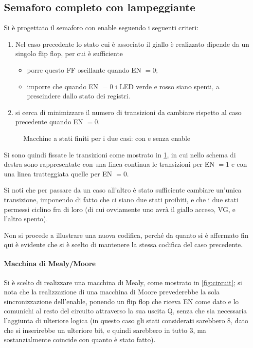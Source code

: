 \documentclass[a4paper,10pt]{article}
\begin{document}
\subsection{Semaforo completo con lampeggiante}

Si è progettato il semaforo con enable seguendo i seguenti criteri:
\begin{enumerate}
	\item Nel caso precedente lo stato cui è associato il giallo è realizzato dipende da un singolo flip flop, per cui è sufficiente
	\begin{itemize}
		\item porre questo FF oscillante quando EN $ = 0 $;
		\item imporre che quando  EN $ = 0 $ i LED verde e rosso siano spenti, a prescindere dallo stato dei registri.
	\end{itemize}
	\item si cerca di minimizzare il numero di transizioni da cambiare rispetto al caso precedente quando EN $ = 0 $.
\end{enumerate}

\begin{figure}[H]
	\centering
	
	\caption{Macchine a stati finiti per i due casi: con e senza enable}
	\label{fig:EN}
\end{figure}

Si sono quindi fissate le transizioni come mostrato in \cref{fig:EN}, in cui nello schema di destra sono rappresentate con una linea continua le transizioni per EN $ = 1 $ e con una linea tratteggiata quelle per EN $ = 0 $.
\newline

Si noti che per passare da un caso all'altro è stato sufficiente cambiare un'unica transizione, imponendo di fatto che ci siano due stati proibiti, e che i due stati permessi ciclino fra di loro (di cui ovviamente uno avrà il giallo acceso, VG, e l'altro spento).
\newline


Non si procede a illustrare una nuova codifica, perché da quanto si è affermato fin qui è evidente che si è scelto di mantenere la stessa codifica del caso precedente.

\paragraph{Macchina di Mealy/Moore} Si è scelto di realizzare una macchina di Mealy, come mostrato in \cref{fig:circuit}; si nota che la realizzazione di una macchina di Moore prevederebbe la sola sincronizzazione dell'enable, ponendo un flip flop che riceva EN come dato e lo comunichi al resto del circuito attraverso la sua uscita Q, senza che sia necessaria l'aggiunta di ulteriore logica (in questo caso gli stati considerati sarebbero $ 8 $, dato che si inserirebbe un ulteriore bit, e quindi sarebbero in tutto $ 3 $, ma sostanzialmente coincide con quanto è stato fatto).
\end{document}
